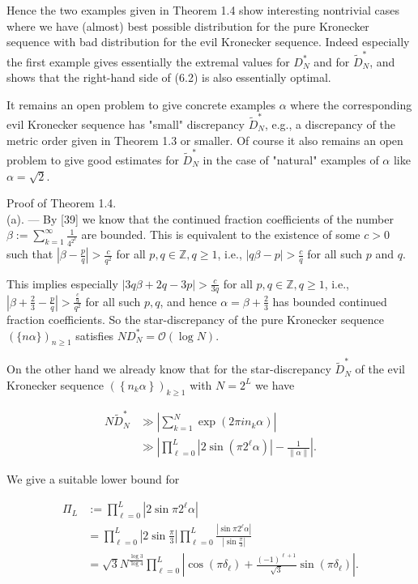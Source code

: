 \documentclass[10pt]{article}
\newcommand{\1}{\mathbf{1}}
\begin{document}
Hence the two examples given in Theorem 1.4 show interesting nontrivial cases where we have (almost) best possible distribution for the pure Kronecker sequence with bad distribution for the evil Kronecker sequence. Indeed especially the first example gives essentially the extremal values for $D_{N}^{*}$ and for $\widetilde{D}_{N}^{*}$, and shows that the right-hand side of (6.2) is also essentially optimal.

It remains an open problem to give concrete examples $\alpha$ where the corresponding evil Kronecker sequence has "small" discrepancy $\widetilde D_N^*$, e.g., a discrepancy of the metric order given in Theorem 1.3 or smaller. Of course it also remains an open problem to give good estimates for $\widetilde{D}_{N}^{*}$ in the case of "natural" examples of $\alpha$ like $\alpha=\sqrt{2}$.

Proof of Theorem 1.4.\\[0pt]
(a). — By [39] we know that the continued fraction coefficients of the number $\beta:=\sum_{k=1}^{\infty} \frac{1}{4^{2^{k}}}$ are bounded. This is equivalent to the existence of some $c>0$ such that $\left|\beta-\frac{p}{q}\right|>\frac{c}{q^{2}}$ for all $p, q \in \mathbb{Z}, q \geqslant 1$, i.e., $|q \beta-p|>\frac{c}{q}$ for all such $p$ and $q$.

This implies especially $|3 q \beta+2 q-3 p|>\frac{c}{3 q}$ for all $p, q \in \mathbb{Z}, q \geqslant 1$, i.e., $\left|\beta+\frac{2}{3}-\frac{p}{q}\right|>\frac{\frac{c}{9}}{q^{2}}$ for all such $p, q$, and hence $\alpha=\beta+\frac{2}{3}$ has bounded continued fraction coefficients. So the star-discrepancy of the pure Kronecker sequence $(\{n \alpha\})_{n \geqslant 1}$ satisfies $N D_{N}^{*}=\mathcal{O}(\log N)$.

On the other hand we already know that for the star-discrepancy $\widetilde{D}_{N}^{*}$ of the evil Kronecker sequence $\left(\left\{n_{k} \alpha\right\}\right)_{k \geqslant 1}$ with $N=2^{L}$ we have

$$
\begin{aligned}
N \widetilde{D}_{N}^{*} & \gg\left|\sum_{k=1}^{N} \exp \left(2 \pi i n_{k} \alpha\right)\right| \\
& \gg\left|\prod_{\ell=0}^{L}|2\sin(\pi2^\ell\alpha)|-\frac1{\|\alpha\|}\right| .
\end{aligned}
$$

We give a suitable lower bound for

$$
\begin{aligned}
\Pi_{L} & :=\prod_{\ell=0}^{L}\left|2 \sin \pi 2^{\ell} \alpha\right| \\
& =\prod_{\ell=0}^{L}\left|2 \sin \frac{\pi}{3}\right| \prod_{\ell=0}^{L} \frac{\left|\sin \pi 2^{\ell} \alpha\right|}{\left|\sin \frac{\pi}{3}\right|} \\
& =\sqrt{3} N^{\frac{\log 3}{\log 4}} \prod_{\ell=0}^{L}\left|\cos \left(\pi \delta_{\ell}\right)+\frac{(-1)^{\ell+1}}{\sqrt{3}} \sin \left(\pi \delta_{\ell}\right)\right| .
\end{aligned}
$$
\end{document}
